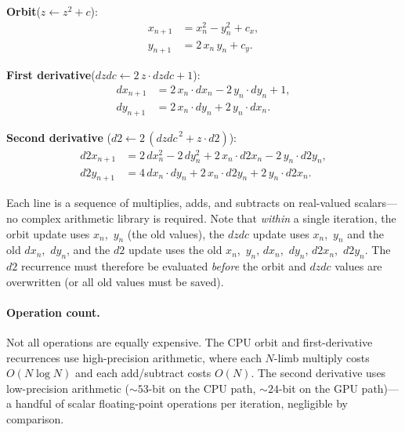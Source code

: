 \medskip\noindent
\textbf{Orbit}\quad ($z \leftarrow z^2 + c$):
\begin{equation}\label{eq:ff-orbit-ri}
\boxed{\begin{aligned}
x_{n+1} &= x_n^2 - y_n^2 + c_x, \\
y_{n+1} &= 2\,x_n\,y_n + c_y.
\end{aligned}}
\end{equation}

\noindent
\textbf{First derivative}\quad ($\mathit{dzdc} \leftarrow 2\,z\cdot\mathit{dzdc} + 1$):
\begin{equation}\label{eq:ff-dzdc-ri}
\boxed{\begin{aligned}
dx_{n+1} &= 2\,x_n \cdot dx_n - 2\,y_n \cdot dy_n + 1, \\
dy_{n+1} &= 2\,x_n \cdot dy_n + 2\,y_n \cdot dx_n.
\end{aligned}}
\end{equation}

\noindent
\textbf{Second derivative}\quad
($d2 \leftarrow 2\,(\mathit{dzdc}^{\,2} + z \cdot d2)$):
\begin{equation}\label{eq:ff-d2-ri}
\boxed{\begin{aligned}
d2x_{n+1} &= 2\,dx_n^2 - 2\,dy_n^2
              + 2\,x_n \cdot d2x_n - 2\,y_n \cdot d2y_n, \\
d2y_{n+1} &= 4\,dx_n \cdot dy_n
              + 2\,x_n \cdot d2y_n + 2\,y_n \cdot d2x_n.
\end{aligned}}
\end{equation}

\noindent
Each line is a sequence of multiplies, adds, and subtracts on real-valued
scalars---no complex arithmetic library is required.  Note that
\emph{within} a single iteration, the orbit update uses $x_n$,~$y_n$ (the
old values), the $\mathit{dzdc}$ update uses $x_n$,~$y_n$ and the old
$dx_n$,~$dy_n$, and the $d2$ update uses the old $x_n$,~$y_n$,
$dx_n$,~$dy_n$, $d2x_n$,~$d2y_n$.  The $d2$ recurrence must therefore be
evaluated \emph{before} the orbit and $\mathit{dzdc}$ values are
overwritten (or all old values must be saved).

\paragraph{Operation count.}
Not all operations are equally expensive.  The CPU orbit and first-derivative
recurrences use high-precision  arithmetic, where each
$N$-limb multiply costs $O(N \log N)$ and each add/subtract costs $O(N)$.
The second derivative uses low-precision
 arithmetic (${\sim}53$-bit on the CPU path,
${\sim}24$-bit on the GPU path)---a handful of scalar floating-point
operations per iteration, negligible by comparison.

